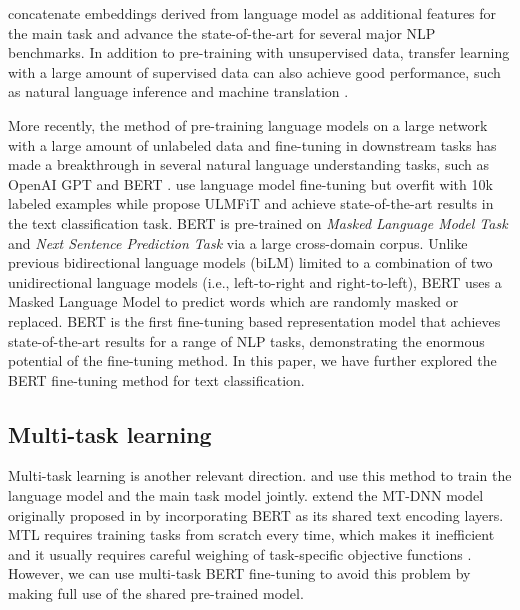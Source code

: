 \documentclass[11pt,a4paper]{article}
\theoremstyle{definition}
\begin{document}
\begin{CJK*}{UTF8}{gbsn}
	\citet{peters2018deep} concatenate embeddings derived from language model as additional features for the main task and advance the state-of-the-art for several major NLP benchmarks. In addition to pre-training with unsupervised data, transfer learning with a large amount of supervised data can also achieve good performance, such as natural language inference \cite{conneau2017supervised} and machine translation \cite{mccann2017learned}.
	
	More recently, the method of pre-training language models on a large network with a large amount of unlabeled data and fine-tuning in downstream tasks has made a breakthrough in several natural language understanding tasks, such as OpenAI GPT \cite{radford2018improving} and BERT \cite{devlin2018bert}. \citet{dai2015semi} use language model fine-tuning but overfit with 10k labeled examples while \citet{howard2018universal} propose ULMFiT and achieve state-of-the-art results in the text classification task. BERT is pre-trained on \textit{Masked Language Model Task} and \textit{Next Sentence Prediction Task} via a large cross-domain corpus. Unlike previous bidirectional language models (biLM) limited to a combination of two unidirectional language models (i.e., left-to-right and right-to-left), BERT uses a Masked Language Model to predict words which are randomly masked or replaced. BERT is the first fine-tuning based representation model that achieves state-of-the-art results for a range of NLP tasks, demonstrating the enormous potential of the fine-tuning method. In this paper, we have further explored the BERT fine-tuning method for text classification.
	
	
	
	
	\subsection{Multi-task learning}
	
	Multi-task learning \cite{richcaruana1993,collobert2008unified} is another relevant direction. \citet{rei2017semi} and \citet{liu2018empower} use this method to train the language model and the main task model jointly. \citet{liu2019multi} extend the MT-DNN model originally proposed in \citet{liu2015representation} by incorporating BERT as its shared text encoding layers. MTL requires training tasks from scratch every time, which makes it inefficient and it usually requires careful weighing of task-specific objective functions \cite{chen2017gradnorm}. However, we can use multi-task BERT fine-tuning to avoid this problem by making full use of the shared pre-trained model.


\end{CJK*}
\end{document}
